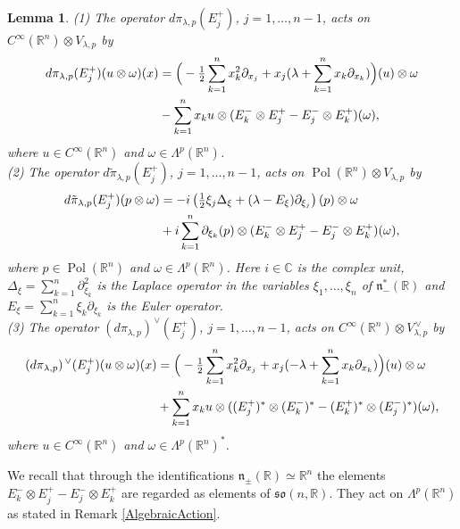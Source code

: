 \documentclass[a4paper,12pt,reqno]{amsart}
\newtheorem{lem}[theorem]{Lemma}
\numberwithin{theorem}{subsection}
\numberwithin{equation}{section}
\begin{document}
\begin{lem}\label{fundamental} (1) The operator ${d}\pi_{\lambda,p}(E_j^+)$, $j=1,\dots, n-1$,
acts on $C^\infty({\mathbb{R}}^n) \otimes V_{\lambda,p}$ by
\begin{align}\label{dualverma}
   {d}\pi_{\lambda,p}(E_j^+)(u \otimes \omega)(x) & =
   \Big(-\tfrac{1}{2} \sum_{k=1}^n x^2_k \partial_{x_j}
   + x_j(\lambda + \sum_{k=1}^{n} x_k\partial_{x_k})\Big)(u) \otimes \omega \notag \\
   & - \sum_{k=1}^n x_k u \otimes (E_k^- \otimes E_j^+ - E_j^- \otimes E_k^+)(\omega),
\end{align}
where $u \in C^\infty({\mathbb{R}}^n)$ and $\omega \in \Lambda^p({\mathbb{R}}^n)$. \\
(2) The operator $d\tilde{\pi}_{\lambda,p}(E_j^+)$, $j=1,\dots,n-1$, acts on
${\operatorname{Pol}}({\mathbb{R}}^n) \otimes V_{\lambda,p}$ by
\begin{align}\label{fourdualverma}
   {d} \tilde{\pi}_{\lambda,p}(E_j^+) (p \otimes \omega)
   & = -i\left(\tfrac{1}{2} \xi_j \Delta_\xi + (\lambda-E_\xi)\partial_{\xi_j} \right)(p) \otimes \omega \notag \\
   & +i \sum_{k=1}^{n} \partial_{\xi_k}(p) \otimes (E_k^- \otimes E_j^+ - E_j^- \otimes E_k^+)(\omega),
\end{align}
where $p \in {\operatorname{Pol}}({\mathbb{R}}^n)$ and $\omega \in \Lambda^p({\mathbb{R}}^n)$. Here $i\in{\mathbb{C}}$ is the
complex unit, $\Delta_\xi=\sum_{k=1}^n\partial_{\xi_k}^2$ is the Laplace
operator in the variables $\xi_1,\dots,\xi_n$ of ${{\mathfrak n}}_-^*({\mathbb{R}})$ and
$E_\xi = \sum_{k=1}^n\xi_k\partial_{\xi_k}$ is the Euler operator. \\
(3) The operator $({d}\pi_{\lambda,p})^{{\,\vee}}(E_j^+)$, $j=1,\dots,n-1$, acts on
$C^\infty({\mathbb{R}}^n) \otimes V^{{\,\vee}}_{\lambda,p}$ by
\begin{align}\label{adjoint}
   ({d}\pi_{\lambda,p})^{{\,\vee}}(E_j^+) (u \otimes \omega)(x) & = \Big(-\tfrac{1}{2}\sum_{k=1}^n x^2_k \partial_{x_j}
   + x_j(-\lambda + \sum_{k=1}^{n} x_k\partial_{x_k})\Big)(u) \otimes \omega \notag \\
   & + \sum_{k=1}^n x_k u \otimes ((E_j^+)^* \otimes (E_k^-)^* - (E_k^+)^* \otimes (E_j^-)^*)(\omega),
\end{align}
where $u \in C^\infty({\mathbb{R}}^n)$ and $\omega \in \Lambda^p({\mathbb{R}}^n)^*$.
\end{lem}

We recall that through the identifications ${{\mathfrak n}}_\pm({\mathbb{R}}) \simeq {\mathbb{R}}^n$ the
elements $E^-_k \otimes E_j^+ - E_j^- \otimes E_k^+$ are regarded as elements
of $\mathfrak{so}(n,{\mathbb{R}})$. They act on $\Lambda^p({\mathbb{R}}^n)$ as stated in Remark
\ref{AlgebraicAction}.
\end{document}
